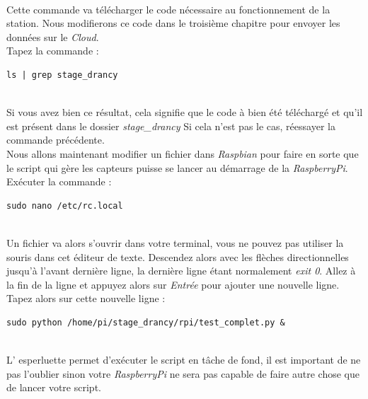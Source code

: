 \\
Cette commande va télécharger le code nécessaire au fonctionnement de la station. Nous modifierons ce code dans le troisième chapitre pour envoyer les données sur le \textit{Cloud}.
\\

Tapez la commande :\\

\begin{lstlisting}[style=MyBashStyle]
	ls | grep stage_drancy
\end{lstlisting}\\%

Si vous avez bien ce résultat, cela signifie que le code à bien été téléchargé et qu'il est présent dans le dossier \textit{stage_drancy} %
Si cela n'est pas le cas, réessayer la commande précédente.\\

Nous allons maintenant modifier un fichier dans \textit{Raspbian} pour faire en sorte que le script qui gère les capteurs puisse se lancer au démarrage de la \textit{RaspberryPi}.\\

Exécuter la commande : \\

\begin{lstlisting}[style=MyBashStyle]
	sudo nano /etc/rc.local
\end{lstlisting}\\

Un fichier va alors s'ouvrir dans votre terminal, vous ne pouvez pas utiliser la souris dans cet éditeur de texte. Descendez alors avec les flèches directionnelles jusqu'à l'avant dernière ligne, la dernière ligne étant normalement \textit{exit 0}. Allez à la fin de la ligne et appuyez alors sur \textit{Entrée} pour ajouter une nouvelle ligne. 
\\
Tapez alors sur cette nouvelle ligne :\\

\begin{lstlisting}[style=MyBashStyle]
	sudo python /home/pi/stage_drancy/rpi/test_complet.py &
\end{lstlisting}\\

L' esperluette permet d'exécuter le script en tâche de fond, il est important de ne pas l'oublier sinon votre \textit{RaspberryPi} ne sera pas capable de faire autre chose que de lancer votre script.

